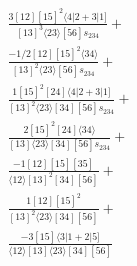 \documentclass[varwidth, border=5pt]{standalone}
\begin{document}
\begin{my}
$\begin{gathered}
\scriptscriptstyle\frac{3[12][15]^2⟨4|2+3|1]}{[13]^3⟨23⟩[56]s_{234}}+\\
\scriptscriptstyle\frac{-1/2[12][15]^2⟨34⟩}{[13]^2⟨23⟩[56]s_{234}}+\\
\scriptscriptstyle\frac{1[15]^2[24]⟨4|2+3|1]}{[13]^2⟨23⟩[34][56]s_{234}}+\\
\scriptscriptstyle\frac{2[15]^2[24]⟨34⟩}{[13]⟨23⟩[34][56]s_{234}}+\\
\scriptscriptstyle\frac{-1[12][15][35]}{⟨12⟩[13]^2[34][56]}+\\
\scriptscriptstyle\frac{1[12][15]^2}{[13]^2⟨23⟩[34][56]}+\\
\scriptscriptstyle\frac{-3[15]⟨3|1+2|5]}{⟨12⟩[13]⟨23⟩[34][56]}\phantom{+}
\end{gathered}$
\end{my}
\end{document}
